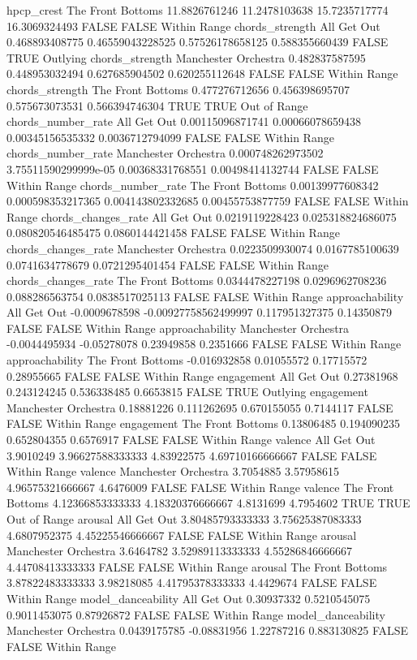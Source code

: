 hpcp_crest The Front Bottoms 11.8826761246 11.2478103638 15.7235717774 16.3069324493 FALSE FALSE Within Range
chords_strength All Get Out 0.468893408775 0.46559043228525 0.57526178658125 0.588355660439 FALSE TRUE Outlying
chords_strength Manchester Orchestra 0.482837587595 0.448953032494 0.627685904502 0.620255112648 FALSE FALSE Within Range
chords_strength The Front Bottoms 0.477276712656 0.456398695707 0.575673073531 0.566394746304 TRUE TRUE Out of Range
chords_number_rate All Get Out 0.00115096871741 0.00066078659438 0.00345156535332 0.0036712794099 FALSE FALSE Within Range
chords_number_rate Manchester Orchestra 0.000748262973502 3.75511590299999e-05 0.00368331768551 0.00498414132744 FALSE FALSE Within Range
chords_number_rate The Front Bottoms 0.00139977608342 0.000598353217365 0.004143802332685 0.00455753877759 FALSE FALSE Within Range
chords_changes_rate All Get Out 0.0219119228423 0.025318824686075 0.080820546485475 0.0860144421458 FALSE FALSE Within Range
chords_changes_rate Manchester Orchestra 0.0223509930074 0.0167785100639 0.0741634778679 0.0721295401454 FALSE FALSE Within Range
chords_changes_rate The Front Bottoms 0.0344478227198 0.0296962708236 0.088286563754 0.0838517025113 FALSE FALSE Within Range
approachability All Get Out -0.0009678598 -0.00927758562499997 0.117951327375 0.14350879 FALSE FALSE Within Range
approachability Manchester Orchestra -0.0044495934 -0.05278078 0.23949858 0.2351666 FALSE FALSE Within Range
approachability The Front Bottoms -0.016932858 0.01055572 0.17715572 0.28955665 FALSE FALSE Within Range
engagement All Get Out 0.27381968 0.243124245 0.536338485 0.6653815 FALSE TRUE Outlying
engagement Manchester Orchestra 0.18881226 0.111262695 0.670155055 0.7144117 FALSE FALSE Within Range
engagement The Front Bottoms 0.13806485 0.194090235 0.652804355 0.6576917 FALSE FALSE Within Range
valence All Get Out 3.9010249 3.96627588333333 4.83922575 4.69710166666667 FALSE FALSE Within Range
valence Manchester Orchestra 3.7054885 3.57958615 4.96575321666667 4.6476009 FALSE FALSE Within Range
valence The Front Bottoms 4.12366853333333 4.18320376666667 4.8131699 4.7954602 TRUE TRUE Out of Range
arousal All Get Out 3.80485793333333 3.75625387083333 4.6807952375 4.45225546666667 FALSE FALSE Within Range
arousal Manchester Orchestra 3.6464782 3.52989113333333 4.55286846666667 4.44708413333333 FALSE FALSE Within Range
arousal The Front Bottoms 3.87822483333333 3.98218085 4.41795378333333 4.4429674 FALSE FALSE Within Range
model_danceability All Get Out 0.30937332 0.5210545075 0.9011453075 0.87926872 FALSE FALSE Within Range
model_danceability Manchester Orchestra 0.0439175785 -0.08831956 1.22787216 0.883130825 FALSE FALSE Within Range
